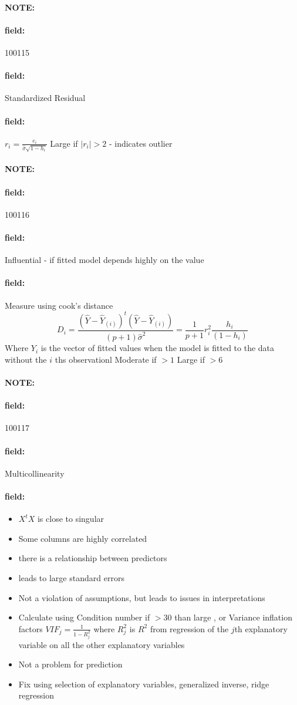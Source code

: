 \documentclass[12pt]{article}
\newenvironment{note}{\paragraph{NOTE:}}{}
\newenvironment{field}{\paragraph{field:}}{}
\begin{document}
\begin{note} \begin{field} \tiny 100115 \end{field}
 \begin{field}
  Standardized Residual
 \end{field}
 \begin{field}
  $r_i = \frac{e_i}{\hat{\sigma}\sqrt{1 - h_i}}$
  Large if $|r_i| > 2$ - indicates outlier
 \end{field}
\end{note}

\begin{note} \begin{field} \tiny 100116 \end{field}
 \begin{field}
  Influential - if fitted model depends highly on the value
 \end{field}
 \begin{field}
  Measure using cook's distance
  $$ D_i = \frac{(\hat{Y} - \hat{Y}_{(i)})^t(\hat{Y} - \hat{Y}_{(i)})}{(p+1)\hat{\sigma}^2} = \frac{1}{p+1}r_i^2 \frac{h_i}{(1 - h_i)}$$
  Where $Y_{i}$ is the vector of fitted values when the model is fitted to the data without the $i$ ths observationl Moderate if $>1 $ Large if $>6$
 \end{field}
\end{note}


\begin{note} \begin{field} \tiny 100117 \end{field}
 \begin{field}
  Multicollinearity
 \end{field}
 \begin{field}
  \begin{itemize}
   \item $X^tX$ is close to singular
   \item Some columns are highly correlated
   \item there is a relationship between predictors \item leads to large standard errors
   \item Not a violation of assumptions, but leads to issues in interpretations
   \item Calculate using Condition number if $>30$ than large , or Variance inflation factors $VIF_j = \frac{1}{1 - R^2_j}$ where $R^2_j$ is $R^2$ from regression of the $j$th explanatory variable on all the other explanatory variables
   \item Not a problem for prediction
   \item Fix using selection of explanatory variables, generalized inverse, ridge regression
  \end{itemize}
 \end{field}
\end{note}
\end{document}
